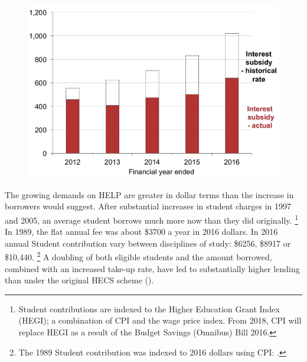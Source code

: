 \documentclass[embargoed]{grattan}
\begin{document}
\begin{figure}
\begin{minipage}[t][\textheight]{\columnwidth}
\includegraphics[page=5]{atlas/Chartpack.pdf}
%
{\textcites{EducationvariousyearsSelectedhighereducation}{EducationvariousyearsHighereducationreport}}

\end{minipage}
\end{figure}



The growing demands on \gls{HELP} are greater in dollar terms than the increase in borrowers would suggest.
After substantial increases in student charges in 1997 and 2005, an average student borrows much more now than they did originally.%
\footnote{Student contributions are indexed to the Higher Education Grant Index (HEGI); a combination of \gls{CPI} and the wage price index.
From 2018, \gls{CPI} will replace HEGI as a result of the Budget Savings (Omnibus) Bill 2016.} In 1989, the flat annual fee was about \$3700 a year in 2016 dollars.
In 2016 annual \gls{Student contribution} vary between disciplines of study: \$6256, \$8917 or \$10,440.%
\footnote{The 1989 \gls{Student contribution} was indexed to 2016 dollars using \gls{CPI}: \textcites{DET2015FundingClusters}{ABS2016ConsumerPriceIndex}.} 
A doubling of both eligible students and the amount borrowed, combined with an increased take-up rate, have led to substantially higher lending than under the original \gls{HECS} scheme ().
\end{document}
